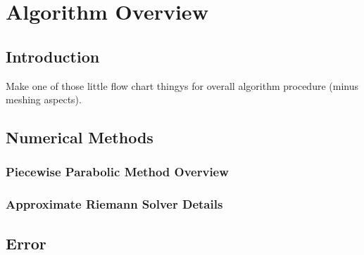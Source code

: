 \chapter{Algorithm Overview}
\section{Introduction}
Make one of those little flow chart thingys for overall algorithm procedure (minus meshing aspects).
\section{Numerical Methods}
\subsection{Piecewise Parabolic Method Overview}
\subsection{Approximate Riemann Solver Details}
\section{Error}